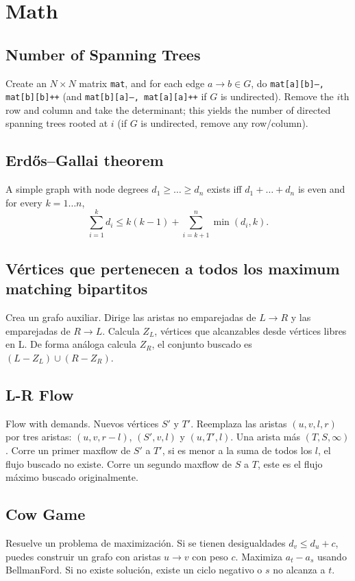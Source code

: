 \section{Math}
	\subsection{Number of Spanning Trees}
		Create an $N\times N$ matrix \texttt{mat}, and for each edge $a \rightarrow b \in G$, do
		\texttt{mat[a][b]--, mat[b][b]++} (and \texttt{mat[b][a]--, mat[a][a]++} if $G$ is undirected).
		Remove the $i$th row and column and take the determinant; this yields the number of directed spanning trees rooted at $i$
		(if $G$ is undirected, remove any row/column).

	\subsection{Erdős–Gallai theorem}
		A simple graph with node degrees $d_1 \ge \dots \ge d_n$ exists iff $d_1 + \dots + d_n$ is even and for every $k = 1\dots n$,
		\[ \sum _{i=1}^{k}d_{i}\leq k(k-1)+\sum _{i=k+1}^{n}\min(d_{i},k). \]

	\subsection{V\'ertices que pertenecen a todos los maximum matching bipartitos}
		Crea un grafo auxiliar. Dirige las aristas no emparejadas de $L \rightarrow R$ y las emparejadas de $R \rightarrow L$.  
		Calcula $Z_L$, v\'ertices que alcanzables desde v\'ertices libres en L. 
		De forma an\'aloga calcula $Z_R$, el conjunto buscado es $(L - Z_L) \cup (R - Z_R)$.

	\subsection{L-R Flow}
		Flow with demands. Nuevos v\'ertices $S'$ y $T'$. Reemplaza las aristas $(u,v,l,r)$ por tres aristas: $(u,v,r-l)$, $(S',v,l)$ y $(u,T',l)$. 
		Una arista m\'as $(T,S,\infty)$. 
		Corre un primer maxflow de $S'$ a $T'$, si es menor a la suma de todos los $l$, el flujo buscado no existe. 
		Corre un segundo maxflow de $S$ a $T$, este es el flujo m\'aximo buscado originalmente.  
	\subsection{Cow Game}
		Resuelve un problema de maximizaci\'on. Si se tienen desigualdades $d_v \leq d_u + c$, puedes construir un grafo con aristas $u \rightarrow v$ con peso $c$. 
		Maximiza $a_t - a_s$ usando BellmanFord. Si no existe soluci\'on, existe un ciclo negativo o $s$ no alcanza a $t$.  